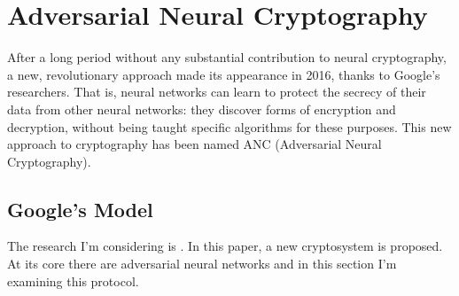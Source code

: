 \documentclass[%
    corpo=11pt,
    twoside,
    stile=classica,
    oldstyle,
    autoretitolo,
    tipotesi=magistrale,
    greek,
    evenboxes,
    english
]{toptesi}
\begin{document}
\chapter{Adversarial Neural Cryptography}
After a long period without any substantial contribution to neural cryptography, a new, revolutionary approach made its appearance in 2016, thanks to Google's researchers. That is, neural networks can learn to protect the secrecy of their data from other neural networks: they discover forms of encryption and decryption, without being taught specific algorithms for these purposes. This new approach to cryptography has been named ANC (Adversarial Neural Cryptography).

\section{Google's Model}
The research I'm considering is \cite{google}. In this paper, a new cryptosystem is proposed. At its core there are adversarial neural networks and in this section I'm examining this protocol.
\end{document}
